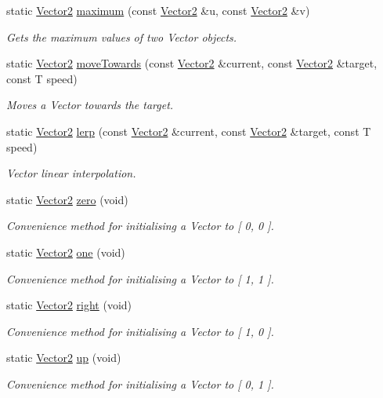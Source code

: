 \begin{DoxyCompactItemize}
static \hyperlink{classsparky_1_1_vector2}{Vector2} \hyperlink{classsparky_1_1_vector2_a840bc220a702dc7c0649433682439282}{maximum} (const \hyperlink{classsparky_1_1_vector2}{Vector2} \&u, const \hyperlink{classsparky_1_1_vector2}{Vector2} \&v)
\begin{DoxyCompactList}\small\item\em Gets the maximum values of two Vector objects. \end{DoxyCompactList}\item 
static \hyperlink{classsparky_1_1_vector2}{Vector2} \hyperlink{classsparky_1_1_vector2_a11fff3da3ab0999fbca089993a776342}{move\+Towards} (const \hyperlink{classsparky_1_1_vector2}{Vector2} \&current, const \hyperlink{classsparky_1_1_vector2}{Vector2} \&target, const T speed)
\begin{DoxyCompactList}\small\item\em Moves a Vector towards the target. \end{DoxyCompactList}\item 
static \hyperlink{classsparky_1_1_vector2}{Vector2} \hyperlink{classsparky_1_1_vector2_aaa23250d4a657cb48f79adbfe14780be}{lerp} (const \hyperlink{classsparky_1_1_vector2}{Vector2} \&current, const \hyperlink{classsparky_1_1_vector2}{Vector2} \&target, const T speed)
\begin{DoxyCompactList}\small\item\em Vector linear interpolation. \end{DoxyCompactList}\item 
static \hyperlink{classsparky_1_1_vector2}{Vector2} \hyperlink{classsparky_1_1_vector2_a9481a8847391cca7213def01a65be4b8}{zero} (void)
\begin{DoxyCompactList}\small\item\em Convenience method for initialising a Vector to \mbox{[} 0, 0 \mbox{]}. \end{DoxyCompactList}\item 
static \hyperlink{classsparky_1_1_vector2}{Vector2} \hyperlink{classsparky_1_1_vector2_acbe0ab8fb2dcb29fdd176a328334b5fc}{one} (void)
\begin{DoxyCompactList}\small\item\em Convenience method for initialising a Vector to \mbox{[} 1, 1 \mbox{]}. \end{DoxyCompactList}\item 
static \hyperlink{classsparky_1_1_vector2}{Vector2} \hyperlink{classsparky_1_1_vector2_a27f5f4198db28574f00e9f63c9a27daf}{right} (void)
\begin{DoxyCompactList}\small\item\em Convenience method for initialising a Vector to \mbox{[} 1, 0 \mbox{]}. \end{DoxyCompactList}\item 
static \hyperlink{classsparky_1_1_vector2}{Vector2} \hyperlink{classsparky_1_1_vector2_ac5daaf099b7019f0925d9c812bbbcf4d}{up} (void)
\begin{DoxyCompactList}\small\item\em Convenience method for initialising a Vector to \mbox{[} 0, 1 \mbox{]}. \end{DoxyCompactList}\end{DoxyCompactItemize}
